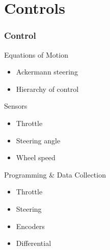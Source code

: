 \documentclass{beamer}
\begin{document}
\section{Controls}
\begin{frame}
	\frametitle{Control}
		\begin{block}{Equations of Motion}
			\begin{itemize}
				\item Ackermann steering
				\item Hierarchy of control
			\end{itemize}
		\end{block}
		\begin{block}{Sensors}
			\begin{itemize}
				\item Throttle
				\item Steering angle
				\item Wheel speed
			\end{itemize}
		\end{block}
		\begin{block}{Programming \& Data Collection}
			\begin{itemize}
				\item Throttle
				\item Steering
				\item Encoders
				\item Differential
			\end{itemize}
		\end{block}		
\end{frame}
\end{document}
